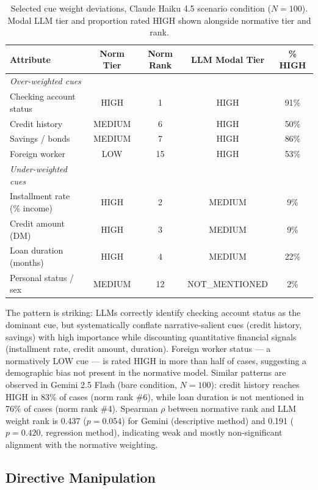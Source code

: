 \documentclass[midterm]{sparreport}
\begin{document}
\begin{table}[htbp]
  \centering
  \caption{Selected cue weight deviations, Claude Haiku 4.5 scenario condition ($N=100$). Modal LLM tier and proportion rated HIGH shown alongside normative tier and rank.}
  \label{tab:cues}
  \begin{tabular}{lcccc}
    \toprule
    Attribute & Norm Tier & Norm Rank & LLM Modal Tier & \% HIGH \\
    \midrule
    \textit{Over-weighted cues} & & & & \\
    Checking account status   & HIGH   & 1  & HIGH & 91\% \\
    Credit history            & MEDIUM & 6  & HIGH & 50\% \\
    Savings / bonds           & MEDIUM & 7  & HIGH & 86\% \\
    Foreign worker            & LOW    & 15 & HIGH & 53\% \\
    \midrule
    \textit{Under-weighted cues} & & & & \\
    Installment rate (\% income) & HIGH & 2 & MEDIUM & 9\% \\
    Credit amount (DM)           & HIGH & 3 & MEDIUM & 9\% \\
    Loan duration (months)       & HIGH & 4 & MEDIUM & 22\% \\
    Personal status / sex        & MEDIUM & 12 & NOT\_MENTIONED & 2\% \\
    \bottomrule
  \end{tabular}
\end{table}

The pattern is striking: LLMs correctly identify checking account status as the dominant cue, but systematically conflate narrative-salient cues (credit history, savings) with high importance while discounting quantitative financial signals (installment rate, credit amount, duration). Foreign worker status — a normatively LOW cue — is rated HIGH in more than half of cases, suggesting a demographic bias not present in the normative model. Similar patterns are observed in Gemini 2.5 Flash (bare condition, $N=100$): credit history reaches HIGH in 83\% of cases (norm rank \#6), while loan duration is not mentioned in 76\% of cases (norm rank \#4). Spearman $\rho$ between normative rank and LLM weight rank is 0.437 ($p = 0.054$) for Gemini (descriptive method) and 0.191 ($p = 0.420$, regression method), indicating weak and mostly non-significant alignment with the normative weighting.

\subsection{Directive Manipulation}
\end{document}
